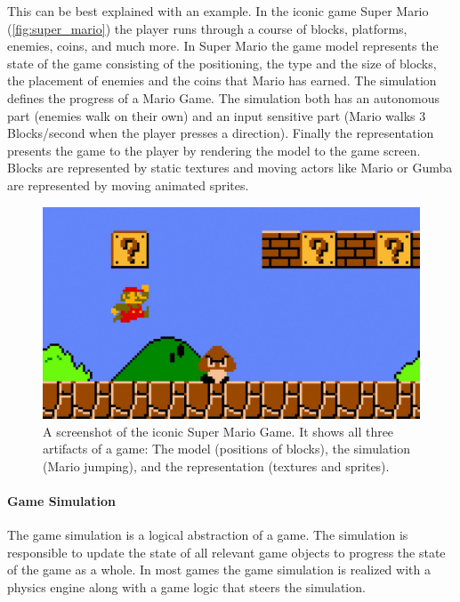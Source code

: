 This can be best explained with an example. In the iconic game Super Mario
(\autoref{fig:super_mario}) the player runs through a course of blocks,
platforms, enemies, coins, and much more. In Super Mario the game model
represents the state of the game consisting of the positioning, the type and the
size of blocks, the placement of enemies and the coins that Mario has earned.
The simulation defines the progress of a Mario Game. The simulation both has an
autonomous part (enemies walk on their own) and an input sensitive part (Mario
walks 3 Blocks/second when the player presses a direction). Finally the
representation presents the game to the player by rendering the model to the
game screen. Blocks are represented by static textures and moving actors like
Mario or Gumba are represented by moving animated \glspl{sprite}.

\begin{figure}
	\centering
	\includegraphics[width=\textwidth]{images/super_mario}
	\caption{A screenshot of the iconic Super Mario Game. It shows all three
	artifacts of a game: The model (positions of blocks), the simulation (Mario
	jumping), and the representation (textures and \glspl{sprite}).}
	\label{fig:super_mario}
\end{figure}

\paragraph{Game Simulation}

The game simulation is a logical abstraction of a game. The simulation is
responsible to update the state of all relevant game objects to progress the
state of the game as a whole. In most games the game simulation is realized with
a physics engine along with a game logic that steers the simulation.

